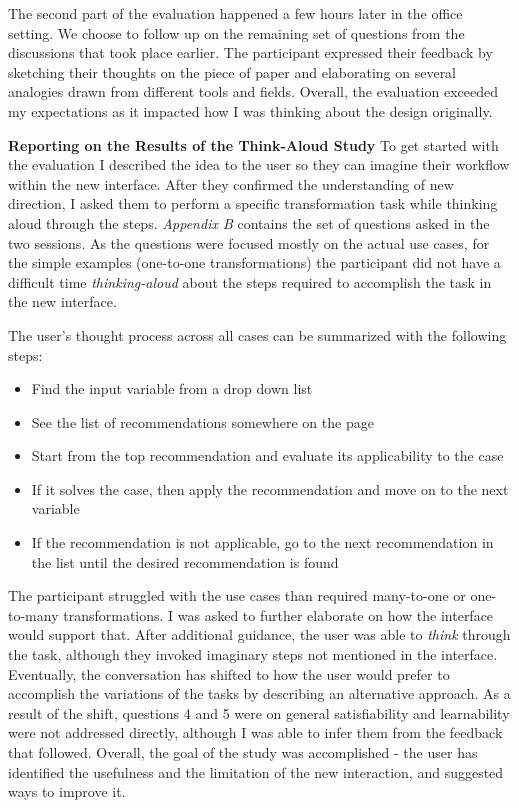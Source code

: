 \documentclass[12pt,letterpaper]{article}
\begin{document}
The second part of the evaluation happened a few hours later in the office setting. We choose to follow up on the remaining set of questions from the discussions that took place earlier. The participant expressed their feedback by sketching their thoughts on the piece of paper and elaborating on several analogies drawn from different tools and fields. Overall, the evaluation exceeded my expectations as it impacted how I was thinking about the design originally. 

\textbf{Reporting on the Results of the Think-Aloud Study}
To get started with the evaluation I described the idea to the user so they can imagine their workflow within the new interface. After they confirmed the understanding of new direction, I asked them to perform a specific transformation task while thinking aloud through the steps. \textit{Appendix B} contains the set of questions asked in the two sessions. As the questions were focused mostly on the actual use cases, for the simple examples (one-to-one transformations) the participant did not have a difficult time \textit{thinking-aloud} about the steps required to accomplish the task in the new interface. 

The user's thought process across all cases can be summarized with the following steps:

\begin{itemize}
    \item Find the input variable from a drop down list
    \item See the list of recommendations somewhere on the page
    \item Start from the top recommendation and evaluate its applicability to the case
    \item If it solves the case, then apply the recommendation and move on to the next variable
    \item If the recommendation is not applicable, go to the next recommendation in the list until the desired recommendation is found
\end{itemize}

The participant struggled with the use cases than required many-to-one or one-to-many transformations. I was asked to further elaborate on how the interface would support that. After additional guidance, the user was able to \textit{think} through the task, although they invoked imaginary steps not mentioned in the interface. Eventually, the conversation has shifted to how the user would prefer to accomplish the variations of the tasks by describing an alternative approach. As a result of the shift, questions 4 and 5 were on general satisfiability and learnability were not addressed directly, although I was able to infer them from the feedback that followed. Overall, the goal of the study was accomplished - the user has identified the usefulness and the limitation of the new interaction, and suggested ways to improve it.  
\end{document}

